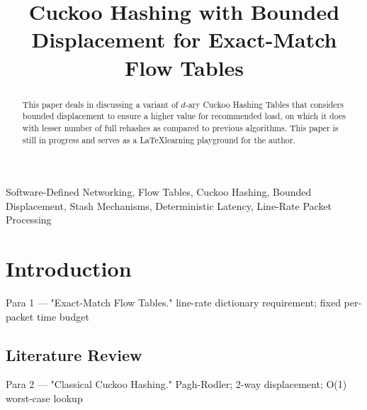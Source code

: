 \documentclass[conference]{IEEEtran}
\begin{document}
	
	\title{Cuckoo Hashing with Bounded Displacement for Exact-Match Flow Tables}
	
	\author{
	}
	
	\maketitle
	
	
	\begin{abstract}
		This paper deals in discussing a variant of $d$-ary Cuckoo Hashing Tables that considers bounded displacement to ensure a higher value for recommended load, on which it does with lesser number of full rehashes as compared to previous algorithms. This paper is still in progress and serves as a \LaTeX learning playground for the author.
	\end{abstract}
	
	\begin{IEEEkeywords}
		Software-Defined Networking, Flow Tables, Cuckoo Hashing, Bounded Displacement, Stash Mechanisms, Deterministic Latency, Line-Rate Packet Processing
	\end{IEEEkeywords}
	
	
	\section{Introduction}
	Para 1 — "Exact-Match Flow Tables."
	line-rate dictionary requirement; fixed per-packet time budget
	
	\subsection{Literature Review}
	Para 2 — "Classical Cuckoo Hashing."
	Pagh-Rodler; 2-way displacement; O(1) worst-case lookup
	
\end{document}

